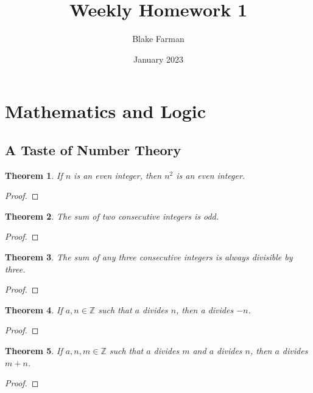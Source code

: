 \documentclass{article}
\title{Weekly Homework 1}
\author{Blake Farman}
\date{January 2023}
\newcommand{\Z}{\mathbb{Z}}
\newtheorem{theorem}{Theorem}
\numberwithin{theorem}{section}
\begin{document}
\maketitle
\setcounter{section}{1}
\section{Mathematics and Logic}
\subsection{A Taste of Number Theory}

\setcounter{theorem}{1}
\begin{theorem}
If \(n\) is an even integer, then \(n^2\) is an even integer.
\end{theorem}

\begin{proof}
\end{proof}

\begin{theorem}
The sum of two consecutive integers is odd.
\end{theorem}

\begin{proof}
\end{proof}

\setcounter{theorem}{6}
\begin{theorem}
The sum of any three consecutive integers is always divisible by three.
\end{theorem}

\begin{proof}
\end{proof}

\setcounter{theorem}{9}
\begin{theorem}
If \(a,n \in \Z\) such that \(a\) divides \(n\), then a divides \(-n\).
\end{theorem}

\begin{proof}
\end{proof}

\begin{theorem}
If \(a,n,m \in \Z\) such that \(a\) divides \(m\) and \(a\) divides \(n\), then \(a\) divides \(m+n\).
\end{theorem}

\begin{proof}
\end{proof}
\end{document}
